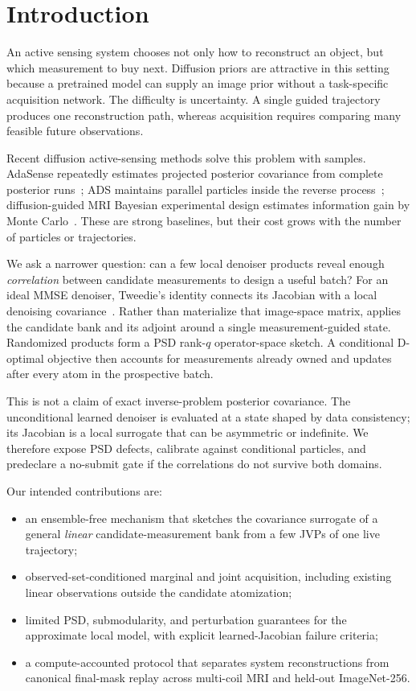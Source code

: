 \section{Introduction}

An active sensing system chooses not only how to reconstruct an object, but
which measurement to buy next.  Diffusion priors are attractive in this
setting because a pretrained model can supply an image prior without a
task-specific acquisition network.  The difficulty is uncertainty.  A single
guided trajectory produces one reconstruction path, whereas acquisition
requires comparing many feasible future observations.

Recent diffusion active-sensing methods solve this problem with samples.
AdaSense repeatedly estimates projected posterior covariance from complete
posterior runs~\cite{elata2024adasense}; ADS maintains parallel particles
inside the reverse process~\cite{nolan2025ads}; diffusion-guided MRI Bayesian
experimental design estimates information gain by Monte
Carlo~\cite{iollo2025bedmri}.  These are strong baselines, but their cost grows
with the number of particles or trajectories.

We ask a narrower question: can a few local denoiser products reveal enough
\emph{correlation} between candidate measurements to design a useful batch?
For an ideal MMSE denoiser, Tweedie's identity connects its Jacobian with a
local denoising covariance~\cite{efron2011tweedie,manor2024posterior}.  Rather
than materialize that image-space matrix, \method{} applies the candidate bank
and its adjoint around a single measurement-guided state.  Randomized products
form a PSD rank-$q$ operator-space sketch.  A conditional D-optimal objective
then accounts for measurements already owned and updates after every atom in
the prospective batch.

This is not a claim of exact inverse-problem posterior covariance.  The
unconditional learned denoiser is evaluated at a state shaped by data
consistency; its Jacobian is a local surrogate that can be asymmetric or
indefinite.  We therefore expose PSD defects, calibrate against conditional
particles, and predeclare a no-submit gate if the correlations do not survive
both domains.

Our intended contributions are:
\begin{itemize}
  \item an ensemble-free mechanism that sketches the covariance surrogate of
  a general \emph{linear} candidate-measurement bank from a few JVPs of one
  live trajectory;
  \item observed-set-conditioned marginal and joint acquisition, including
  existing linear observations outside the candidate atomization;
  \item limited PSD, submodularity, and perturbation guarantees for the
  approximate local model, with explicit learned-Jacobian failure criteria;
  \item a compute-accounted protocol that separates system reconstructions
  from canonical final-mask replay across multi-coil MRI and held-out
  ImageNet-256.
\end{itemize}
